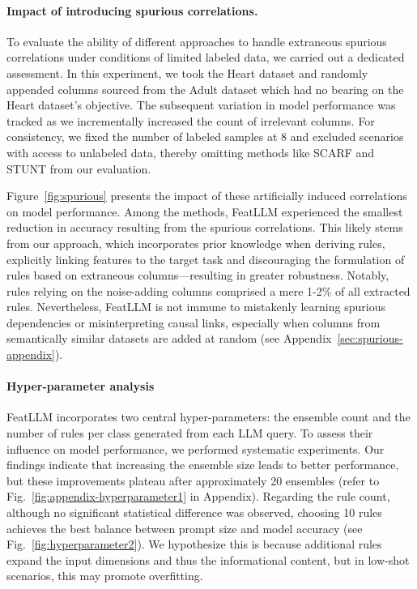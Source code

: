 \paragraph{Impact of introducing spurious correlations.} To evaluate the ability of different approaches to handle extraneous spurious correlations under conditions of limited labeled data, we carried out a dedicated assessment. In this experiment, we took the Heart dataset and randomly appended columns sourced from the Adult dataset which had no bearing on the Heart dataset’s objective. The subsequent variation in model performance was tracked as we incrementally increased the count of irrelevant columns. For consistency, we fixed the number of labeled samples at 8 and excluded scenarios with access to unlabeled data, thereby omitting methods like SCARF and STUNT from our evaluation.

Figure~\ref{fig:spurious} presents the impact of these artificially induced correlations on model performance. Among the methods, \textsf{FeatLLM} experienced the smallest reduction in accuracy resulting from the spurious correlations. This likely stems from our approach, which incorporates prior knowledge when deriving rules, explicitly linking features to the target task and discouraging the formulation of rules based on extraneous columns—resulting in greater robustness. Notably, rules relying on the noise-adding columns comprised a mere 1-2\% of all extracted rules. Nevertheless, \textsf{FeatLLM} is not immune to mistakenly learning spurious dependencies or misinterpreting causal links, especially when columns from semantically similar datasets are added at random (see Appendix~\ref{sec:spurious-appendix}).

\vspace*{-0.12in}
\paragraph{Hyper-parameter analysis}
\textsf{FeatLLM} incorporates two central hyper-parameters: the ensemble count and the number of rules per class generated from each LLM query. To assess their influence on model performance, we performed systematic experiments. Our findings indicate that increasing the ensemble size leads to better performance, but these improvements plateau after approximately 20 ensembles (refer to Fig.~\ref{fig:appendix-hyperparameter1} in Appendix). Regarding the rule count, although no significant statistical difference was observed, choosing 10 rules achieves the best balance between prompt size and model accuracy (see Fig.~\ref{fig:hyperparameter2}). We hypothesize this is because additional rules expand the input dimensions and thus the informational content, but in low-shot scenarios, this may promote overfitting.


